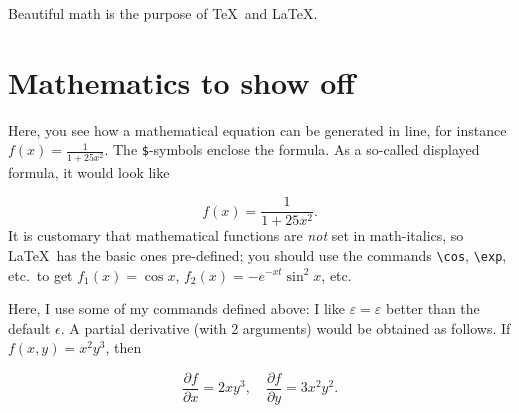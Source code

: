 \renewcommand\TheFile{ch03_mathematics.tex}
\newcommand\premathpar{\vspace{-2\parskip}\par}
\begin{savequote}[15cm]
  \vspace{-30mm}
  \raggedleft
  \sffamily
  Beautiful math is the purpose of \TeX\ and \LaTeX.
\end{savequote}
\chapter{Mathematics to show off}
\newcommand{\half}{\frac{1}{2}}
\newcommand{\eps}{\varepsilon}
\newcommand{\rh}{\rho}
\newcommand{\mtheta}{\vartheta}
\newcommand{\ph}{\varphi}
\newcommand{\der}[2]{\frac{\partial {#1}}{\partial {#2}}}

Here, you see how a mathematical equation can be generated in line, for
instance $f(x) = \frac{1}{1+25 x^2}$.
The \verb+$+-symbols enclose the formula.
As a so-called displayed formula, it would look like\premathpar
\begin{displaymath}
  f(x) = \frac{1}{1+25 x^2}.
\end{displaymath}
It is customary that mathematical functions are \emph{not} set in math-italics,
so \LaTeX\ has the basic ones pre-defined; you should use the commands
\verb+\cos+, \verb+\exp+, etc.\ to get $f_1(x) = \cos x$,
$f_2(x) = - e^{-xt} \sin^2 x$, etc.

Here, I use some of my commands defined above: I like $\eps = \varepsilon$
better than the default $\epsilon$. A partial derivative (with 2 arguments)
would be obtained as follows. If $f(x,y) = x^2 y^3$, then \premathpar
\begin{displaymath}
  \der{f}{x} = 2 x y^3, \quad \der{f}{y} = 3 x^2 y^2.
\end{displaymath}
